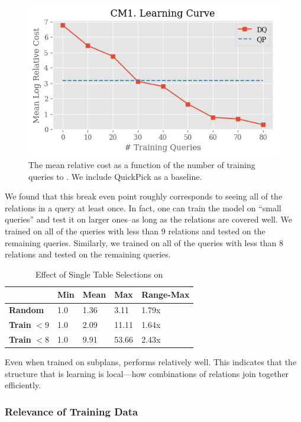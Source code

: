 \begin{figure}
    \centering
    \includegraphics[width=0.8\columnwidth]{exp/exp2_plot1.png}
    \caption{The mean relative cost as a function of the number of training queries to \sys. We include QuickPick as a baseline. \label{exp:plot2}}
\end{figure}

We found that this break even point roughly corresponds to seeing all of the relations in a query at least once. In fact, one can train the model on ``small queries'' and test it on larger ones--as long as the relations are covered well. We trained \sys on all of the queries with less than 9 relations and tested on the remaining queries. Similarly, we trained on all of the queries with less than 8 relations and tested on the remaining queries. 

\begin{table}[ht!]\centering \small
\caption{Effect of Single Table Selections on \sys }\vspace{0.25em}
\begin{tabular}{|l|l|l|l|l|}\hline
    & {\bf Min}  & {\bf Mean}  & {\bf Max}    & {\bf Range-Max} \\ \hline
{\bf Random}  & 1.0  & 1.36   & 3.11    & 1.79x\\ \hline
{\bf Train} $< 9$  & 1.0  & 2.09   & 11.11    & 1.64x\\ \hline
{\bf Train} $< 8$  & 1.0  & 9.91   & 53.66    & 2.43x\\ \hline
\end{tabular}
\end{table}

Even when trained on subplans, \sys performs relatively well. This indicates that the structure that \sys is learning is local---how combinations of relations join together efficiently.

\subsubsection{Relevance of Training Data}


